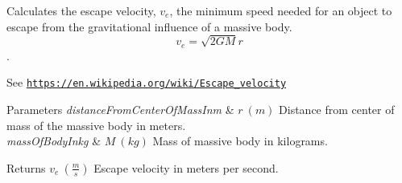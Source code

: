 Calculates the escape velocity, $v_{e}$, the minimum speed needed for an object to escape from the gravitational influence of a massive body. \[v_{e}=\sqrt{2 G M}{r}\]. 

See \href{https://en.wikipedia.org/wiki/Escape_velocity}{\tt https\+://en.\+wikipedia.\+org/wiki/\+Escape\+\_\+velocity}


\begin{DoxyParams}{Parameters}
{\em distance\+From\+Center\+Of\+Mass\+Inm} & $r\ (m)$ Distance from center of mass of the massive body in meters. \\
\hline
{\em mass\+Of\+Body\+Inkg} & $M\ (kg)$ Mass of massive body in kilograms. \\
\hline
\end{DoxyParams}
\begin{DoxyReturn}{Returns}
$v_{e}\ (\frac{m}{s})$ Escape velocity in meters per second. 
\end{DoxyReturn}
